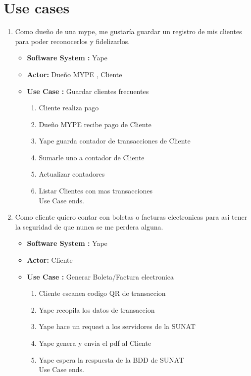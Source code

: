\documentclass{article}
\begin{document}
\section{Use cases}
\begin{enumerate}
    \item Como dueño de una mype, me gustaría guardar un registro de mis clientes para poder reconocerlos y fidelizarlos.
    \begin{itemize}
        \item \textbf{Software System :} Yape
        \item \textbf{Actor: } Dueño MYPE , Cliente
        \item \textbf{Use Case : } Guardar clientes frecuentes 
        \begin{enumerate}
            \item Cliente realiza pago
            \item Dueño MYPE recibe pago de Cliente
            \item Yape guarda contador de transacciones de Cliente
            \item Sumarle uno a contador de Cliente
            \item Actualizar contadores
            \item Listar Clientes con mas transacciones\\
            Use Case ends.
        \end{enumerate}
    \end{itemize}
    
    \item Como cliente quiero contar con boletas o facturas electronicas para asi tener la seguridad de que nunca se me perdera alguna.
   \begin{itemize}
        \item \textbf{Software System :} Yape 
        \item \textbf{Actor: } Cliente
        \item \textbf{Use Case : } Generar Boleta/Factura electronica 
        \begin{enumerate}
            \item Cliente escanea codigo QR de transaccion
            \item Yape recopila los datos de transaccion
            \item Yape hace un request a los servidores de la SUNAT
            \item Yape genera y envia el pdf al Cliente
            \item Yape espera la respuesta de la BDD de SUNAT\\
            Use Case ends.
        \end{enumerate}
    \end{itemize}
    

\end{enumerate}
\end{document}
